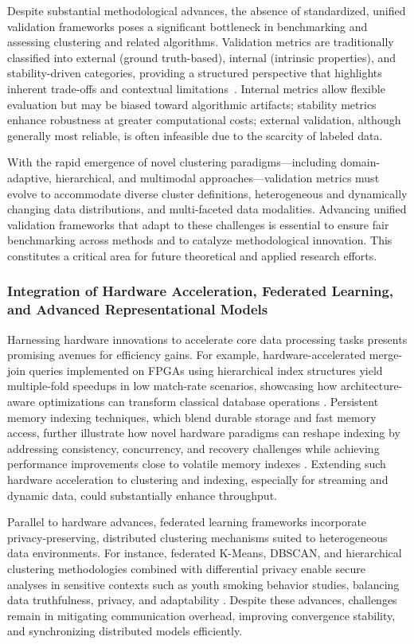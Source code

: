 \documentclass[sigconf]{acmart}
\begin{document}
Despite substantial methodological advances, the absence of standardized, unified validation frameworks poses a significant bottleneck in benchmarking and assessing clustering and related algorithms. Validation metrics are traditionally classified into external (ground truth-based), internal (intrinsic properties), and stability-driven categories, providing a structured perspective that highlights inherent trade-offs and contextual limitations~\cite{ref24}. Internal metrics allow flexible evaluation but may be biased toward algorithmic artifacts; stability metrics enhance robustness at greater computational costs; external validation, although generally most reliable, is often infeasible due to the scarcity of labeled data.

With the rapid emergence of novel clustering paradigms—including domain-adaptive, hierarchical, and multimodal approaches—validation metrics must evolve to accommodate diverse cluster definitions, heterogeneous and dynamically changing data distributions, and multi-faceted data modalities. Advancing unified validation frameworks that adapt to these challenges is essential to ensure fair benchmarking across methods and to catalyze methodological innovation. This constitutes a critical area for future theoretical and applied research efforts.

\subsubsection{Integration of Hardware Acceleration, Federated Learning, and Advanced Representational Models}

Harnessing hardware innovations to accelerate core data processing tasks presents promising avenues for efficiency gains. For example, hardware-accelerated merge-join queries implemented on FPGAs using hierarchical index structures yield multiple-fold speedups in low match-rate scenarios, showcasing how architecture-aware optimizations can transform classical database operations \cite{ref27}. Persistent memory indexing techniques, which blend durable storage and fast memory access, further illustrate how novel hardware paradigms can reshape indexing by addressing consistency, concurrency, and recovery challenges while achieving performance improvements close to volatile memory indexes \cite{ref27}. Extending such hardware acceleration to clustering and indexing, especially for streaming and dynamic data, could substantially enhance throughput.

Parallel to hardware advances, federated learning frameworks incorporate privacy-preserving, distributed clustering mechanisms suited to heterogeneous data environments. For instance, federated K-Means, DBSCAN, and hierarchical clustering methodologies combined with differential privacy enable secure analyses in sensitive contexts such as youth smoking behavior studies, balancing data truthfulness, privacy, and adaptability \cite{ref25}. Despite these advances, challenges remain in mitigating communication overhead, improving convergence stability, and synchronizing distributed models efficiently.
\end{document}
